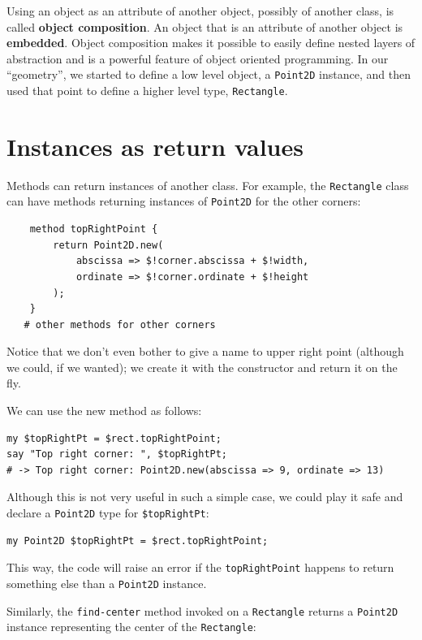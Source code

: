 Using an object as an attribute of another object, possibly 
of another class, is called {\bf object composition}. An object 
that is an attribute of another object is {\bf embedded}. Object 
composition makes it possible to easily define nested layers of 
abstraction and is a powerful feature of object oriented 
programming. In our ``geometry'', we started to define a low 
level object, a {\tt Point2D} instance, and then used that point 
to define a higher level type, {\tt Rectangle}.


\section{Instances as return values}

Methods can return instances of another class.  For example, 
the {\tt Rectangle} class can have methods returning 
instances of {\tt Point2D} for the other corners:

\begin{verbatim}
    method topRightPoint {
        return Point2D.new(
            abscissa => $!corner.abscissa + $!width, 
            ordinate => $!corner.ordinate + $!height
        );
    }
   # other methods for other corners
\end{verbatim}

Notice that we don't even bother to give a name to upper right 
point (although we could, if we wanted); we create it with the 
constructor and return it on the fly.

We can use the new method as follows:

\begin{verbatim}
my $topRightPt = $rect.topRightPoint;
say "Top right corner: ", $topRightPt;
# -> Top right corner: Point2D.new(abscissa => 9, ordinate => 13)
\end{verbatim}

Although this is not very useful in such a simple case, we 
could play it safe and declare a {\tt Point2D} type for 
\verb'$topRightPt':

\begin{verbatim}
my Point2D $topRightPt = $rect.topRightPoint;
\end{verbatim} 

This way, the code will raise an error if the {\tt topRightPoint} 
happens to return something else than a {\tt Point2D} instance.

Similarly, the \verb"find-center" method invoked on a 
{\tt Rectangle} returns a {\tt Point2D} instance 
representing the center of the {\tt Rectangle}:

